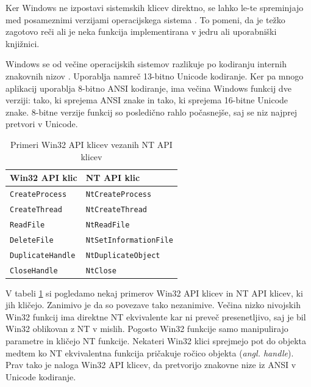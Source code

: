 \documentclass[a4paper,12pt,openright]{book}
\begin{document}
Ker Windows ne izpostavi sistemskih klicev direktno, se lahko le-te spreminjajo med posameznimi verzijami operacijskega sistema \cite{Tanenbaum_Bos_2023}.
To pomeni, da je težko zagotovo reči ali je neka funkcija implementirana v jedru ali uporabniški knjižnici.

Windows se od večine operacijskih sistemov razlikuje po kodiranju internih znakovnih nizov \cite{Yosifovich_Russinovich_Solomon_Ionescu_2017}. Uporablja namreč 13-bitno Unicode kodiranje.
Ker pa mnogo aplikacij uporablja 8-bitno ANSI kodiranje, ima večina Windows funkcij dve verziji: tako, ki sprejema ANSI znake in tako, ki sprejema 16-bitne Unicode znake.
8-bitne verzije funkcij so posledično rahlo počasnejše, saj se niz najprej pretvori v Unicode.

\begin{table}[h!]
	\begin{center}
		\begin{tabular}{ l|l }
			Win32 API klic         & NT API klic                 \\
			\hline
			\verb|CreateProcess|   & \verb|NtCreateProcess|      \\
			\verb|CreateThread|    & \verb|NtCreateThread|       \\
			\verb|ReadFile|        & \verb|NtReadFile|           \\
			\verb|DeleteFile|      & \verb|NtSetInformationFile| \\
			\verb|DuplicateHandle| & \verb|NtDuplicateObject|    \\
			\verb|CloseHandle|     & \verb|NtClose|              \\
		\end{tabular}
	\end{center}
	\caption{Primeri Win32 API klicev vezanih NT API klicev \cite{Tanenbaum_Bos_2023}}
	\label{tab:example_win32_nt_mapping}
\end{table}

V tabeli \ref{tab:example_win32_nt_mapping} si pogledamo nekaj primerov Win32 API klicev in NT API klicev, ki jih kličejo.
Zanimivo je da so povezave tako nezanimive.
Večina nizko nivojskih Win32 funkcij ima direktne NT ekvivalente kar ni preveč presenetljivo, saj je bil Win32 oblikovan z NT v mislih\cite{Tanenbaum_Bos_2023}.
Pogosto Win32 funkcije samo manipulirajo parametre in kličejo NT funkcije.
Nekateri Win32 klici sprejmejo pot do objekta medtem ko NT ekvivalentna funkcija pričakuje ročico objekta (\textit{angl. handle}).
Prav tako je naloga Win32 API klicev, da pretvorijo znakovne nize iz ANSI v Unicode kodiranje.
\end{document}

